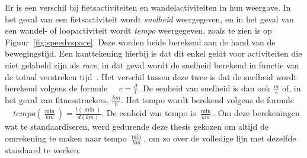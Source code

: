 Er is een verschil bij fietsactiviteiten en wandelactiviteiten in hun weergave.
In het geval van een fietsactiviteit wordt \textit{snelheid} weergegeven, en in
het geval van een wandel- of loopactiviteit wordt \textit{tempo} weergegeven,
zoals te zien is op Figuur~\ref{fig:speedvspace}. Deze worden beide berekend
aan de hand van de bewegingstijd. Een kanttekening hierbij is dat dit enkel
geldt voor activiteiten die niet gelabeld zijn als \textit{race}, in dat geval
wordt de snelheid berekend in functie van de totaal verstreken
tijd~\cite{MovingTi80:online}. Het verschil tussen deze twee is dat de snelheid
wordt berekend volgens de formule $ \quad v = \frac{d}{t}$. De eenheid van
snelheid is dan ook $\frac{m}{s}$ of, in het geval van fitnesstrackers,
$\frac{km}{h}$. Het tempo wordt berekend volgens de formule $ \quad
    tempo(\frac{\min}{km}) = \frac{t(\min)}{d(km)}$. De eenheid van tempo is
$\frac{\min}{km}$. Om deze berekeningen wat te standaardiseren, werd gedurende
deze thesis gekozen om altijd de omrekening te maken naar tempo
$\frac{\min}{km}$, om zo over de volledige lijn met dezelfde standaard te
werken.
